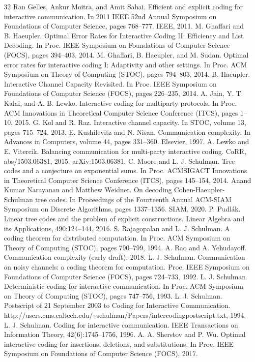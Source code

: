 \begin{thebibliography}{32}
 Ran Gelles, Ankur Moitra, and Amit Sahai. Efficient and explicit coding for interactive communication. In 2011 IEEE 52nd Annual Symposium on Foundations of Computer Science, pages 768–777. IEEE, 2011.
 M. Ghaffari and B. Haeupler. Optimal Error Rates for Interactive Coding II: Efficiency and List Decoding. In Proc. IEEE Symposium on Foundations of Computer Science (FOCS), pages 394–403, 2014.
 M. Ghaffari, B. Haeupler, and M. Sudan. Optimal error rates for interactive coding I: Adaptivity and other settings. In Proc. ACM Symposium on Theory of Computing (STOC), pages 794–803, 2014.
 B. Haeupler. Interactive Channel Capacity Revisited. In Proc. IEEE Symposium on Foundations of Computer Science (FOCS), pages 226–235, 2014.
 A. Jain, Y. T. Kalai, and A. B. Lewko. Interactive coding for multiparty protocols. In Proc. ACM Innovations in Theoretical Computer Science Conference (ITCS), pages 1–10, 2015.
 G. Kol and R. Raz. Interactive channel capacity. In STOC, volume 13, pages 715–724, 2013.
 E. Kushilevitz and N. Nisan. Communication complexity. In Advances in Computers, volume 44, pages 331–360. Elsevier, 1997.
 A. Lewko and E. Vitercik. Balancing communication for multi-party interactive coding. CoRR, abs/1503.06381, 2015. arXiv:1503.06381.
 C. Moore and L. J. Schulman. Tree codes and a conjecture on exponential sums. In Proc. ACMSIGACT Innovations in Theoretical Computer Science Conference (ITCS), pages 145–154, 2014.
 Anand Kumar Narayanan and Matthew Weidner. On decoding Cohen-Haeupler-Schulman tree codes. In Proceedings of the Fourteenth Annual ACM-SIAM Symposium on Discrete Algorithms, pages 1337–1356. SIAM, 2020.
 P. Pudlák. Linear tree codes and the problem of explicit constructions. Linear Algebra and its Applications, 490:124–144, 2016.
 S. Rajagopalan and L. J. Schulman. A coding theorem for distributed computation. In Proc. ACM Symposium on Theory of Computing (STOC), pages 790–799, 1994.
 A. Rao and A. Yehudayoff. Communication complexity (early draft), 2018.
 L. J. Schulman. Communication on noisy channels: a coding theorem for computation. Proc. IEEE Symposium on Foundations of Computer Science (FOCS), pages 724–733, 1992.
 L. J. Schulman. Deterministic coding for interactive communication. In Proc. ACM Symposium on Theory of Computing (STOC), pages 747–756, 1993.
 L. J. Schulman. Postscript of 21 September 2003 to Coding for Interactive Communication. http://users.cms.caltech.edu/\textasciitilde{}schulman/Papers/intercodingpostscript.txt, 1994.
 L. J. Schulman. Coding for interactive communication. IEEE Transactions on Information Theory, 42(6):1745–1756, 1996.
 A. A. Sherstov and P. Wu. Optimal interactive coding for insertions, deletions, and substitutions. In Proc. IEEE Symposium on Foundations of Computer Science (FOCS), 2017.
\end{thebibliography}

